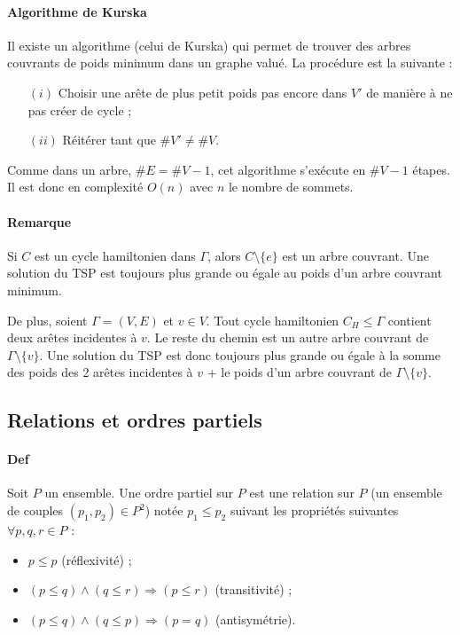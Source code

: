 \documentclass{article}
\begin{document}
			\paragraph{Algorithme de Kurska} Il existe un algorithme (celui de Kurska) qui permet de trouver des arbres couvrants de poids minimum
			dans un graphe valué. La procédure est la suivante :

			\begin{itemize}
				\item[$(i)$] Choisir une arête de plus petit poids pas encore dans $V'$ de manière à ne pas créer de cycle ;
				\item[$(ii)$] Réitérer tant que $\#V' \neq \#V$.
			\end{itemize}

			Comme dans un arbre, $\#E = \#V - 1$, cet algorithme s'exécute en $\#V - 1$ étapes. Il est donc en complexité $O(n)$ avec $n$ le nombre
			de sommets.

			\paragraph{Remarque} Si $C$ est un cycle hamiltonien dans $\Gamma$, alors $C \setminus \{e\}$ est un arbre couvrant. Une solution du TSP
			est toujours plus grande ou égale au poids d'un arbre couvrant minimum.

			De plus, soient $\Gamma = (V, E)$ et $v \in V$. Tout cycle hamiltonien $C_H \leq \Gamma$ contient deux arêtes incidentes à $v$. Le reste
			du chemin est un autre arbre couvrant de $\Gamma \setminus \{v\}$. Une solution du TSP est donc toujours plus grande ou égale à la somme
			des poids des 2 arêtes incidentes à $v$ + le poids d'un arbre couvrant de $\Gamma \setminus \{v\}$.

		\subsection{Relations et ordres partiels}
			\paragraph{Def} Soit $P$ un ensemble. Une ordre partiel sur $P$ est une relation sur $P$ (un ensemble de couples $(p_1, p_2) \in P^2$)
			notée $p_1 \leq p_2$ suivant les propriétés suivantes $\forall p, q, r \in P$ :

			\begin{itemize}
				\item $p \leq p$ (réflexivité) ;
				\item $(p \leq q) \land (q \leq r) \Rightarrow (p \leq r)$ (transitivité) ;
				\item $(p \leq q) \land (q \leq p) \Rightarrow (p = q)$ (antisymétrie).
			\end{itemize}
\end{document}
